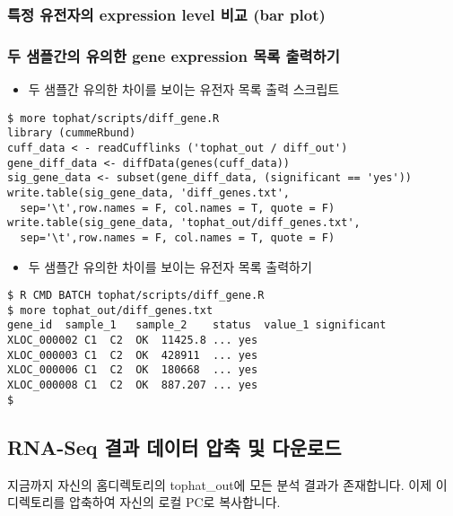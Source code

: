 \documentclass{article}
\begin{document}
\subsubsection{특정 유전자의 expression level 비교 (bar plot)}
\subsubsection{두 샘플간의 유의한 gene expression 목록 출력하기}

\begin{itemize}
\item
  \begin{itemize}
  두 샘플간 유의한 차이를 보이는 유전자 목록 출력 스크립트  
  \end{itemize}
\end{itemize}
\begin{lstlisting}[frame=single,style=Bash,xleftmargin=1.4cm,xrightmargin=1.4cm]
$ more tophat/scripts/diff_gene.R 
library (cummeRbund)
cuff_data < - readCufflinks ('tophat_out / diff_out')
gene_diff_data <- diffData(genes(cuff_data))
sig_gene_data <- subset(gene_diff_data, (significant == 'yes'))
write.table(sig_gene_data, 'diff_genes.txt', 
  sep='\t',row.names = F, col.names = T, quote = F)
write.table(sig_gene_data, 'tophat_out/diff_genes.txt', 
  sep='\t',row.names = F, col.names = T, quote = F)
\end{lstlisting}

\begin{itemize}
\item
  \begin{itemize}
  두 샘플간 유의한 차이를 보이는 유전자 목록 출력하기  
  \end{itemize}
\end{itemize}
\begin{lstlisting}[frame=single,style=Bash,xleftmargin=1.4cm,xrightmargin=1.4cm]
$ R CMD BATCH tophat/scripts/diff_gene.R 
$ more tophat_out/diff_genes.txt 
gene_id  sample_1	sample_2	status	value_1	significant
XLOC_000002	C1	C2	OK	11425.8	...	yes
XLOC_000003	C1	C2	OK	428911	...	yes
XLOC_000006	C1	C2	OK	180668	...	yes
XLOC_000008	C1	C2	OK	887.207	...	yes
$ 
\end{lstlisting}

\subsection{RNA-Seq 결과 데이터 압축 및 다운로드}
지금까지 자신의 홈디렉토리의 tophat\_out에 모든 분석 결과가 존재합니다. 이제 이 디렉토리를 압축하여 자신의 로컬 PC로 복사합니다.
\end{document}
